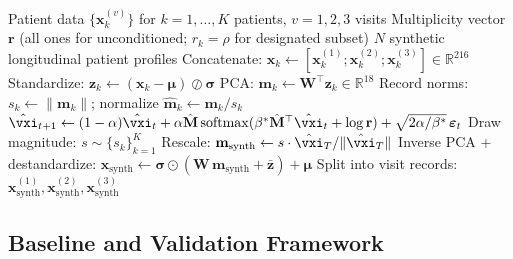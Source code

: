 \begin{algorithm}[ht]
\caption{Multiplicity-Weighted SA for Longitudinal Patient Generation}
\label{alg:sa-pipeline}
\begin{algorithmic}[1]
\Require Patient data $\{\mathbf{x}_k^{(v)}\}$ for $k=1,\ldots,K$ patients, $v=1,2,3$ visits
\Require Multiplicity vector $\mathbf{r}$ (all ones for unconditioned; $r_k = \rho$ for designated subset)
\Ensure $N$ synthetic longitudinal patient profiles
\State Concatenate: $\mathbf{x}_k \gets [\mathbf{x}_k^{(1)}; \mathbf{x}_k^{(2)}; \mathbf{x}_k^{(3)}] \in \mathbb{R}^{216}$
\State Standardize: $\mathbf{z}_k \gets (\mathbf{x}_k - \boldsymbol{\mu}) \oslash \boldsymbol{\sigma}$
\State PCA: $\mathbf{m}_k \gets \mathbf{W}^\top \mathbf{z}_k \in \mathbb{R}^{18}$ 
\State Record norms: $s_k \gets \|\mathbf{m}_k\|$; normalize $\hat{\mathbf{m}}_k \gets \mathbf{m}_k / s_k$
\State {}
    \State {}
    \State {}
     
        \State $\hat{\vxi}_{t+1} \gets (1-\alpha)\hat{\vxi}_t + \alpha\hat{\mathbf{M}}\,\mathrm{softmax}(\beta^*\hat{\mathbf{M}}^\top\hat{\vxi}_t + \log\mathbf{r}) + \sqrt{2\alpha/\beta^*}\,\boldsymbol{\varepsilon}_t$
    \EndFor
    \State Draw magnitude: $s \sim \{s_k\}_{k=1}^K$
    \State Rescale: $\mathbf{m}_{\text{synth}} \gets s \cdot \hat{\vxi}_T / \|\hat{\vxi}_T\|$
    \State Inverse PCA + destandardize: $\mathbf{x}_{\text{synth}} \gets \boldsymbol{\sigma} \odot (\mathbf{W}\,\mathbf{m}_{\text{synth}} + \bar{\mathbf{z}}) + \boldsymbol{\mu}$
    \State Split into visit records: $\mathbf{x}_{\text{synth}}^{(1)}, \mathbf{x}_{\text{synth}}^{(2)}, \mathbf{x}_{\text{synth}}^{(3)}$
\EndFor
\end{algorithmic}
\end{algorithm}

\subsection{Baseline and Validation Framework}
\label{sec:validation}


